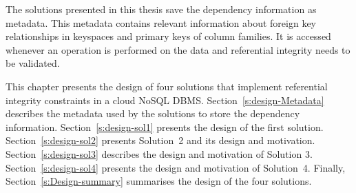 The solutions presented in this thesis save the dependency information as
metadata.   This metadata contains relevant  information about  foreign
key relationships in keyspaces and primary keys of column families.   It is
accessed whenever an operation is performed on the data and referential
integrity needs to be validated.  


This chapter presents the design of  four  solutions  that implement referential
integrity constraints in a cloud \ac{NoSQL} \ac{DBMS}.  
Section~\ref{s:design-Metadata} describes the metadata used by the solutions 
 to store the dependency information.   Section~\ref{s:design-sol1} presents the
 design of the first solution.   Section~\ref{s:design-sol2} presents Solution~2
 and its design and motivation.   Section~\ref{s:design-sol3} describes the design
 and motivation of Solution 3.   Section~\ref{s:design-sol4} presents the design
 and motivation of Solution~4.   Finally,  Section~\ref{s:Design-summary}
 summarises the design of the four solutions.  













